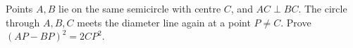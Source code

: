 Points $A,B$ lie on the same semicircle with centre $C$, and $AC\perp BC$. The circle through $A,B,C$ meets the diameter line again at a point $P\ne C$. Prove $(AP-BP)^2=2CP^2$.
